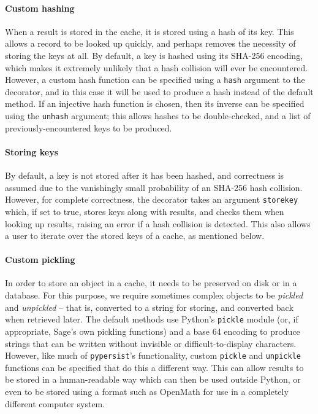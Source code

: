 \documentclass{deliverablereport}
\begin{document}
\paragraph{Custom hashing}
When a result is stored in the cache, it is stored using a hash of its key.
This allows a record to be looked up quickly, and perhaps removes the necessity
of storing the keys at all.  By default, a key is hashed using its SHA-256
encoding, which makes it extremely unlikely that a hash collision will ever be
encountered.  However, a custom hash function can be specified using a
\texttt{hash} argument to the decorator, and in this case it will be used to
produce a hash instead of the default method.  If an injective hash function is
chosen, then its inverse can be specified using the \texttt{unhash} argument;
this allows hashes to be double-checked, and a list of previously-encountered
keys to be produced.

\paragraph{Storing keys}
By default, a key is not stored after it has been hashed, and correctness is
assumed due to the vanishingly small probability of an SHA-256 hash collision.
However, for complete correctness, the decorator takes an argument
\texttt{storekey} which, if set to true, stores keys along with results, and
checks them when looking up results, raising an error if a hash collision is
detected.  This also allows a user to iterate over the stored keys of a cache,
as mentioned below.

\paragraph{Custom pickling}
In order to store an object in a cache, it needs to be preserved on disk or in a
database.  For this purpose, we require sometimes complex objects to be
\textit{pickled} and \textit{unpickled} -- that is, converted to a string for
storing, and converted back when retrieved later.  The default methods use
Python's \texttt{pickle} module (or, if appropriate, Sage's own pickling
functions) and a base 64 encoding to produce strings that
can be written without invisible or difficult-to-display characters.  However,
like much of \texttt{pypersist}'s functionality, custom \texttt{pickle} and
\texttt{unpickle} functions can be specified that do this a different way.  This
can allow results to be stored in a human-readable way which can then be used
outside Python, or even to be stored using a format such as OpenMath for use in
a completely different computer system.
\end{document}
